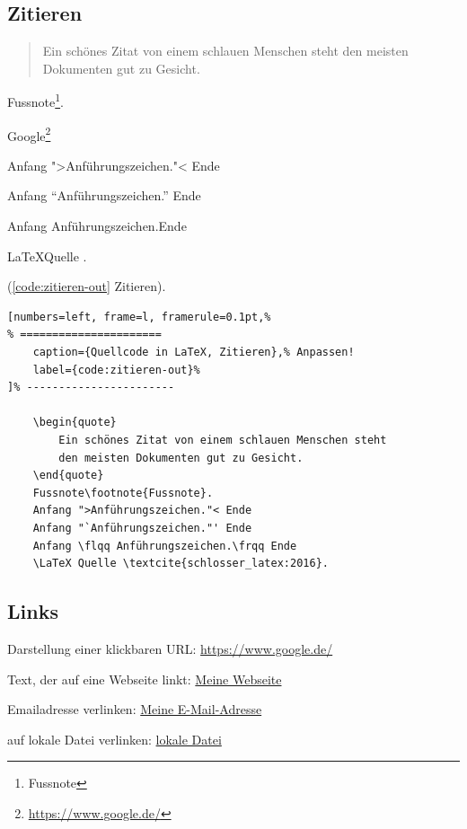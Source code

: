 \newpage %

\subsection{Zitieren}\label{sec:zitieren}

\begin{quote}
Ein schönes Zitat von einem schlauen Menschen steht den meisten Dokumenten
gut zu Gesicht.
\end{quote}

Fussnote\footnote{Fussnote}.

Google\footnote{\url{https://www.google.de/}}

Anfang ">Anführungszeichen."< Ende

Anfang "`Anführungszeichen."' Ende

Anfang \flqq Anführungszeichen.\frqq Ende

\LaTeX Quelle \textcite{schlosser_latex:2016}.

(\autoref{code:zitieren-out} Zitieren).
\lstset{language=[LaTeX]TeX} %
\begin{lstlisting}[numbers=left, frame=l, framerule=0.1pt,%
% ======================
	caption={Quellcode in LaTeX, Zitieren},% Anpassen!
	label={code:zitieren-out}%
]% -----------------------

	\begin{quote}
		Ein schönes Zitat von einem schlauen Menschen steht
		den meisten Dokumenten gut zu Gesicht.
	\end{quote}
	Fussnote\footnote{Fussnote}.
	Anfang ">Anführungszeichen."< Ende
	Anfang "`Anführungszeichen."' Ende
	Anfang \flqq Anführungszeichen.\frqq Ende
	\LaTeX Quelle \textcite{schlosser_latex:2016}.
\end{lstlisting}

\newpage %

\subsection{Links}\label{sec:links}

Darstellung einer klickbaren URL: \url{https://www.google.de/}

Text, der auf eine Webseite linkt: \href{/}{Meine Webseite}

Emailadresse verlinken: \href{mailto:jan@ju1.eu}{Meine E-Mail-Adresse}

auf lokale Datei verlinken: \href{run:/content/hallo.c}{lokale Datei}

